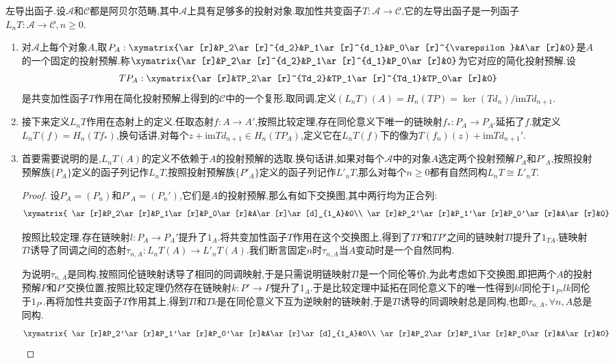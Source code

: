 左导出函子.设$\mathscr{A}$和$\mathscr{C}$都是阿贝尔范畴,其中$\mathscr{A}$上具有足够多的投射对象.取加性共变函子$T:\mathscr{A}\to\mathscr{C}$,它的左导出函子是一列函子$L_nT:\mathscr{A}\to\mathscr{C},n\ge0$.
\begin{enumerate}
	\item 对$\mathscr{A}$上每个对象$A$,取$P_A:\xymatrix{\ar[r]&P_2\ar[r]^{d_2}&P_1\ar[r]^{d_1}&P_0\ar[r]^{\varepsilon}&A\ar[r]&0}$是$A$的一个固定的投射预解.称$\xymatrix{\ar[r]&P_2\ar[r]^{d_2}&P_1\ar[r]^{d_1}&P_0\ar[r]&0}$为它对应的简化投射预解.设$$TP_A:\xymatrix{\ar[r]&TP_2\ar[r]^{Td_2}&TP_1\ar[r]^{Td_1}&TP_0\ar[r]&0}$$是共变加性函子$T$作用在简化投射预解上得到的$\mathscr{C}$中的一个复形.取同调,定义$(L_nT)(A)=H_n(TP)=\ker(Td_n)/\mathrm{im}Td_{n+1}$.
	\item 接下来定义$L_nT$作用在态射上的定义.任取态射$f:A\to A'$,按照比较定理,存在同伦意义下唯一的链映射$f_*:P_A\to P_{A'}$延拓了$f$.就定义$L_nT(f)=H_n(Tf_*)$,换句话讲,对每个$z+\mathrm{im}Td_{n+1}\in H_n(TP_A)$,定义它在$L_nT(f)$下的像为$T(f_n)(z)+\mathrm{im}Td_{n+1}'$.
	\item 首要需要说明的是,$L_nT(A)$的定义不依赖于$A$的投射预解的选取.换句话讲,如果对每个$\mathscr{A}$中的对象$A$选定两个投射预解$P_A$和$P'_A$,按照投射预解族$\{P_A\}$定义的函子列记作$L_nT$,按照投射预解族$\{P'_A\}$定义的函子列记作$L'_nT$,那么对每个$n\ge0$都有自然同构$L_nT\cong L'_nT$.
	\begin{proof}
		
		设$P_A=(P_n)$和$P'_A=(P_n')$,它们是$A$的投射预解,那么有如下交换图,其中两行均为正合列:$$\xymatrix{
			\ar[r]&P_2\ar[r]&P_1\ar[r]&P_0\ar[r]&A\ar[r]\ar[d]_{1_A}&0\\
			\ar[r]&P_2'\ar[r]&P_1'\ar[r]&P_0'\ar[r]&A\ar[r]&0}$$
		
		按照比较定理.存在链映射$l:P_A\to P_A'$提升了$1_A$.将共变加性函子$T$作用在这个交换图上,得到了$TP$和$TP'$之间的链映射$Tl$提升了$1_{TA}$.链映射$Tl$诱导了同调之间的态射$\tau_{n,A}:L_nT(A)\to L'_nT(A)$.我们断言固定$n$时$\tau_{n,A}$当$A$变动时是一个自然同构.
		
		为说明$\tau_{n,A}$是同构,按照同伦链映射诱导了相同的同调映射,于是只需说明链映射$Tl$是一个同伦等价,为此考虑如下交换图,即把两个$A$的投射预解$P$和$P'$交换位置,按照比较定理仍然存在链映射$k:P'\to P$提升了$1_A$.于是比较定理中延拓在同伦意义下的唯一性得到$kl$同伦于$1_{P}$,$lk$同伦于$1_{P'}$.再将加性共变函子$T$作用其上,得到$Tl$和$Tk$是在同伦意义下互为逆映射的链映射,于是$Tl$诱导的同调映射总是同构,也即$\tau_{n,A},\forall n,A$总是同构.
		$$\xymatrix{
			\ar[r]&P_2'\ar[r]&P_1'\ar[r]&P_0'\ar[r]&A\ar[r]\ar[d]_{1_A}&0\\
			\ar[r]&P_2\ar[r]&P_1\ar[r]&P_0\ar[r]&A\ar[r]&0}$$
		

\end{proof}
\end{enumerate}
